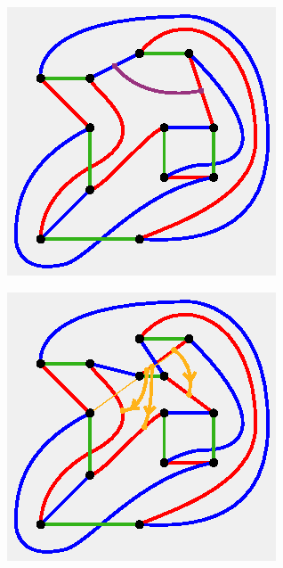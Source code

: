 \documentclass[11pt, oneside]{amsart}
\theoremstyle{theorem}
\theoremstyle{definition}
\theoremstyle{theorem}
\begin{document}
\begin{figure}[h!]
\begin{subfigure}{.25\textwidth}
  \centering
  \includegraphics[width=.9\linewidth]{nonbt11.eps}
    \label{nxb11}
\end{subfigure}%
\begin{subfigure}{.25\textwidth}
  \centering
  \includegraphics[width=.9\linewidth]{nonbt12.eps}
  \label{nxb12}
\end{subfigure}

\end{figure}
\end{document}
